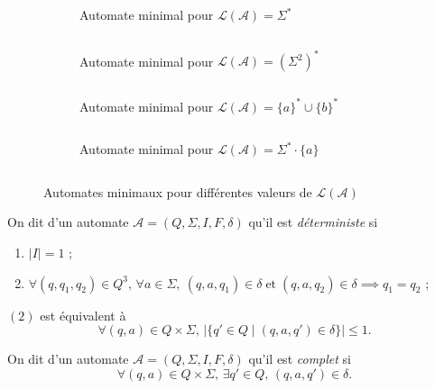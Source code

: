\begin{figure}[H]
	\centering
	$\quad$\\
	\begin{subfigure}{0.35\textwidth}
		\centering
		\caption{Automate minimal pour $\mathcal{L}(\mathcal{A}) = \Sigma^*$}
	\end{subfigure}
	$\quad$
	\begin{subfigure}{0.35\textwidth}
		\centering
		\caption{Automate minimal pour $\mathcal{L}(\mathcal{A}) = (\Sigma^2)^*$}
	\end{subfigure}
	$\quad$\\
	\begin{subfigure}{0.35\textwidth}
		\centering
		\caption{Automate minimal pour $\mathcal{L}(\mathcal{A}) = \{a\}^* \cup \{b\}^*$}
	\end{subfigure}
	$\quad$
	\begin{subfigure}{0.35\textwidth}
		\centering
		\caption{Automate minimal pour $\mathcal{L}(\mathcal{A}) = \Sigma^* \cdot \{a\}$}
	\end{subfigure}
	$\quad$\\
	\caption{Automates minimaux pour différentes valeurs de $\mathcal{L}(\mathcal{A})$}
\end{figure}

\begin{defn}
	On dit d'un automate $\mathcal{A} = (Q, \Sigma, I, F, \delta)$\/ qu'il est {\it déterministe}\/ si
	\begin{enumerate}
		\item $|I| = 1$\/ ;
		\item $\forall (q, q_1, q_2) \in Q^3,\,\forall a \in \Sigma,\:(q,a,q_1) \in \delta \mathrel{\text{et}} (q, a, q_2) \in \delta \implies q_1 = q_2$ ;
	\end{enumerate}
\end{defn}

\begin{rmk}
	$(2)$\/ est équivalent à \[
		\forall (q,a) \in Q \times \Sigma,\,\big|\{q' \in Q  \mid (q,a,q') \in \delta\}\big| \le 1
	.\]
\end{rmk}

\begin{defn}
	On dit d'un automate $\mathcal{A} = (Q, \Sigma, I, F, \delta)$ qu'il est {\it complet}\/ si \[
		\forall (q,a) \in Q\times \Sigma,\,\exists q' \in Q,\,(q,a,q') \in \delta
	.\]
\end{defn}

